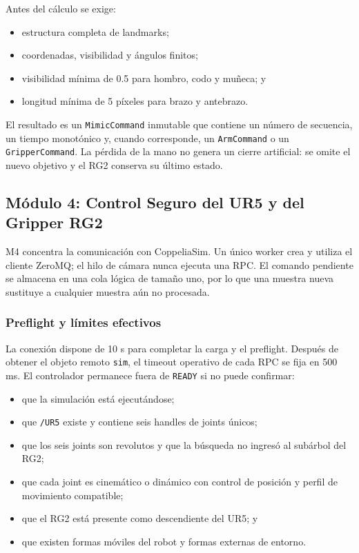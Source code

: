 Antes del cálculo se exige:

\begin{itemize}
    \item estructura completa de landmarks;
    \item coordenadas, visibilidad y ángulos finitos;
    \item visibilidad mínima de 0.5 para hombro, codo y muñeca; y
    \item longitud mínima de 5 píxeles para brazo y antebrazo.
\end{itemize}

El resultado es un \texttt{MimicCommand} inmutable que contiene un número de
secuencia, un tiempo monotónico y, cuando corresponde, un
\texttt{ArmCommand} o un \texttt{GripperCommand}. La pérdida de la mano no
genera un cierre artificial: se omite el nuevo objetivo y el RG2 conserva su
último estado.

\subsection{Módulo 4: Control Seguro del UR5 y del Gripper RG2}
\label{subsec:implementacion_m4}

M4 concentra la comunicación con CoppeliaSim. Un único worker crea y utiliza
el cliente ZeroMQ; el hilo de cámara nunca ejecuta una RPC. El comando
pendiente se almacena en una cola lógica de tamaño uno, por lo que una muestra
nueva sustituye a cualquier muestra aún no procesada.

\subsubsection*{Preflight y límites efectivos}

La conexión dispone de 10 s para completar la carga y el preflight. Después de
obtener el objeto remoto \texttt{sim}, el timeout operativo de cada RPC se fija
en 500 ms. El controlador permanece fuera de \texttt{READY} si no puede
confirmar:

\begin{itemize}
    \item que la simulación está ejecutándose;
    \item que \texttt{/UR5} existe y contiene seis handles de joints únicos;
    \item que los seis joints son revolutos y que la búsqueda no ingresó al
    subárbol del RG2;
    \item que cada joint es cinemático o dinámico con control de posición y
    perfil de movimiento compatible;
    \item que el RG2 está presente como descendiente del UR5; y
    \item que existen formas móviles del robot y formas externas de entorno.
\end{itemize}

